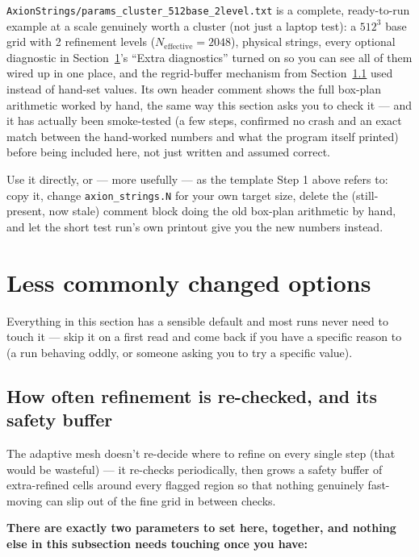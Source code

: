 \documentclass[11pt]{article}
\begin{document}
\texttt{AxionStrings/params\_cluster\_512base\_2level.txt} is a complete, ready-to-run example at a scale
genuinely worth a cluster (not just a laptop test): a $512^3$ base grid with 2 refinement levels
($N_\mathrm{effective}=2048$), physical strings, every optional diagnostic in Section~\ref{sec:advanced}'s
``Extra diagnostics'' turned on so you can see all of them wired up in one place, and the regrid-buffer
mechanism from Section~\ref{sec:regrid-buffer} used instead of hand-set values. Its own header comment shows
the full box-plan arithmetic worked by hand, the same way this section asks you to check it --- and it has
actually been smoke-tested (a few steps, confirmed no crash and an exact match between the hand-worked
numbers and what the program itself printed) before being included here, not just written and assumed
correct.

Use it directly, or --- more usefully --- as the template Step 1 above refers to: copy it, change
\texttt{axion\_strings.N} for your own target size, delete the (still-present, now stale) comment block
doing the old box-plan arithmetic by hand, and let the short test run's own printout give you the new
numbers instead.

\section{Less commonly changed options}
\label{sec:advanced}

Everything in this section has a sensible default and most runs never need to touch it --- skip it on a
first read and come back if you have a specific reason to (a run behaving oddly, or someone asking you to
try a specific value).

\subsection{How often refinement is re-checked, and its safety buffer}
\label{sec:regrid-buffer}

The adaptive mesh doesn't re-decide where to refine on every single step (that would be wasteful) --- it
re-checks periodically, then grows a safety buffer of extra-refined cells around every flagged region so
that nothing genuinely fast-moving can slip out of the fine grid in between checks.

\textbf{There are exactly two parameters to set here, together, and nothing else in this subsection needs
touching once you have:}
\end{document}
